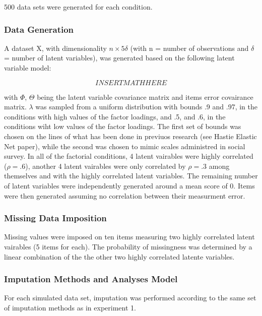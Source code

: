 500 data sets were generated for each condition. 

\subsubsection{Data Generation}

A dataset X, with dimensionality $n \times 5\delta$ (with n = number of observations and $\delta$ = number 
of latent variables), was generated based on the following latent variable model:

\begin{equation}
	INSERT MATH HERE
\end{equation}

with $\Phi$, $\Theta$ being the latent variable covariance matrix and items error covairance matrix.
$\lambda$ was sampled from a uniform distribution with bounds .9 and .97, in the conditions with 
high values of the factor loadings, and .5, and .6, in the conditions wiht low values of the factor loadings.
The first set of bounds was chosen on the lines of what has been done in previuos research (see Hastie Elastic 
Net paper), while the second was chosen to mimic scales administred in social survey.
In all of the factorial conditions, 4 latent vairables were highly correlated ($\rho = .6$), another
4 latent vairables were only correlated by $\rho = .3$ among themselves and with the highly correlated latent
variables. The remaining number of latent variables were independently generated around a mean score of 0.
Items were then generated assuming no correlation between their measurment error.

\subsubsection{Missing Data Imposition}

Missing values were imposed on ten items measuring two highly correlated latent vairables (5 items for each).
The probability of missingness was determined by a linear combination of the the other two highly correlated
latente variables.

\subsubsection{Imputation Methods and Analyses Model}

For each simulated data set, imputation was performed according to the same set of imputation methods as in 
experiment 1.

